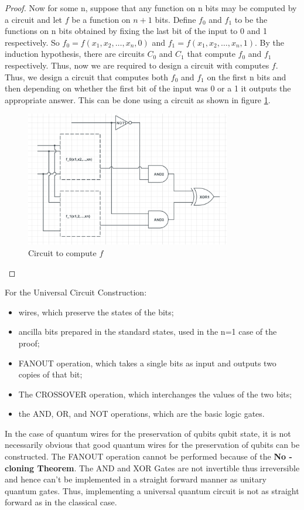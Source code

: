 \documentclass[12pt, oneside]{book}
\theoremstyle{definition}
\theoremstyle{definition}
\theoremstyle{remark}
\begin{document}
\begin{proof}
    Now for some n, suppose that any function on n bits may be computed by a circuit and let $f$ be a function on $n+1$ bits. 
    Define $f_0$ and $f_1$ to be the functions on n bits obtained by fixing the last bit of the input to 0 and 1 respectively.
    So $f_0=f(x_1,x_2,\ldots,x_n,0)$ and $f_1=f(x_1,x_2,\ldots,x_n,1)$.
    By the induction hypothesis, there are circuits $C_0$ and $C_1$ that compute $f_0$ and $f_1$ respectively.
    Thus, now we are required to design a circuit with computes $f$. Thus, we design a circuit that computes both $f_0$ and $f_1$ 
    on the first n bits and then depending on whether the first bit of the input was 0 or a 1 it outputs the appropriate answer.
    This can be done using a circuit as shown in figure \ref{fig:compute}.
    \begin{figure}[H]
        \centering
        \includegraphics[width=0.8\textwidth]{../images/compute.png}
        \caption{Circuit to compute $f$}
        \label{fig:compute}
    \end{figure}
\end{proof}
For the Universal Circuit Construction:
\begin{itemize}
    \item wires, which preserve the states of the bits;
    \item ancilla bits prepared in the standard states, used in the n=1 case of the proof;
    \item FANOUT operation, which takes a single bits as input and outputs two copies of that bit;
    \item The CROSSOVER operation, which interchanges the values of the two bits;
    \item the AND, OR, and NOT operations, which are the basic logic gates.
\end{itemize}

In the case of quantum wires for the preservation of qubits qubit state, it is not necessarily obvious that good quantum wires for
the preservation of qubits can be constructed. The FANOUT operation cannot be performed because of the \textbf{No - cloning Theorem}.
The AND and XOR Gates are not invertible thus irreversible and hence can't be implemented in a straight forward manner as unitary quantum gates.
Thus, implementing a universal quantum circuit is not as straight forward as in the classical case.
\end{document}
